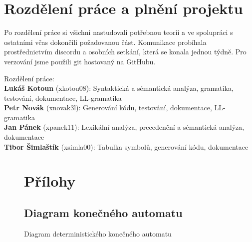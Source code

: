 \documentclass[11pt]{article}
\begin{document}
\section{Rozdělení práce a plnění projektu}
Po rozdělení práce si všichni nastudovali potřebnou teorii a ve spolupráci s ostatními včas
dokončili požadovanou část. Komunikace probíhala prostřednictvím discordu a osobních setkání,
která se konala jednou týdně. Pro verzování jsme použili git hostovaný na GitHubu. 

Rozdělení práce: \\[1em]
\textbf{Lukáš Kotoun} (xkotou08): Syntaktická a sémantická analýza, gramatika, testování, dokumentace, LL-gramatika \\
\textbf{Petr Novák} (xnovak3l): Generování kódu, testování, dokumentace, LL-gramatika \\
\textbf{Jan Pánek} (xpanek11): Lexikální analýza, precedenční a sémantická analýza, dokumentace \\
\textbf{Tibor Šimlaštík} (xsimla00): Tabulka symbolů, generování kódu, dokumentace    \\





\begin{landscape}
    \thispagestyle{empty}
    \begin{figure}[!h]
        \section{Přílohy}
        \subsection{Diagram konečného automatu}
        \begin{center}
        \caption{Diagram deterministického konečného automatu}
        \label{fig:fsm}
        \end{center}
    \end{figure}
\end{landscape}
\restoregeometry
\end{document}
